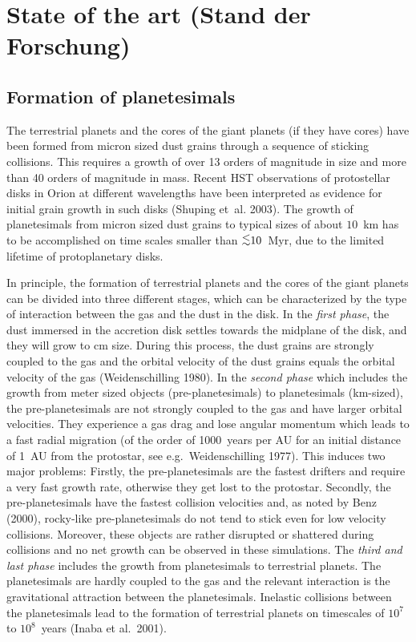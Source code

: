 \section{State of the art (Stand der Forschung)}
\subsection{Formation of planetesimals}
The terrestrial planets and the cores of the giant planets (if they have
cores) have been formed from micron sized dust grains through a sequence of
sticking collisions. This requires a growth of over 13 orders of magnitude
in size and more than 40 orders of magnitude in mass.  Recent HST
observations of protostellar disks in Orion at different wavelengths have
been interpreted as evidence for initial grain growth in such disks
({Shuping} {et~al.} 2003).  The growth of planetesimals from micron sized
dust grains to typical sizes of about $10$~km has to be accomplished on time
scales smaller than $\lsim 10$~Myr, due to the limited lifetime of
protoplanetary disks.

In principle, the formation of terrestrial planets and the cores of the
giant planets can be divided into three different stages, which can be
characterized by the type of interaction between the gas and the dust in the
disk. In the {\it first phase}, the dust immersed in the accretion disk
settles towards the midplane of the disk, and they will grow to cm
size. During this process, the dust grains are strongly coupled to the gas
and the orbital velocity of the dust grains equals the orbital velocity of
the gas (Weidenschilling 1980). In the {\it second phase} which includes the
growth from meter sized objects (pre-planetesimals) to planetesimals
(km-sized), the pre-planetesimals are not strongly coupled to the gas and
have larger orbital velocities. They experience a gas drag and lose angular
momentum which leads to a fast radial migration (of the order of 1000~years
per AU for an initial distance of 1~AU from the protostar, see e.g.\
Weidenschilling 1977). This induces two major problems: Firstly, the
pre-planetesimals are the fastest drifters and require a very fast growth
rate, otherwise they get lost to the protostar. Secondly, the
pre-planetesimals have the fastest collision velocities and, as noted by
Benz (2000), rocky-like pre-planetesimals do not tend to stick even for low
velocity collisions.  Moreover, these objects are rather disrupted or
shattered during collisions and no net growth can be observed in these
simulations. The {\it third and last phase} includes the growth from
planetesimals to terrestrial planets. The planetesimals are hardly coupled
to the gas and the relevant interaction is the gravitational attraction
between the planetesimals. Inelastic collisions between the planetesimals
lead to the formation of terrestrial planets on timescales of $10^{7}$ to
$10^{8}$~years (Inaba et al.~2001).

